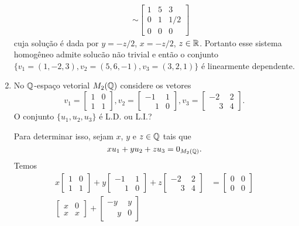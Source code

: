 \begin{exemplos}
\begin{enumerate}
\begin{align*}
\begin{array}{l}
				\end{array}\\&\sim
				\begin{bmatrix}
					1 & 5 & 3\\
					0 & 1 & 1/2\\
					0 & 0 & 0
				\end{bmatrix}
			\end{align*}
			cuja solução é dada por $y = -z/2$, $x =-z/2$, $z \in \mathbb{R}$. Portanto esse
			sistema homogêneo admite solucão não trivial e então o conjunto
			$\{v_1 = (1, -2, 3), v_2 = (5, 6, -1), v_3 = (3, 2, 1)\}$ é linearmente dependente.

		\item No $\mathbb{Q}$-espaço vetorial $M_2(\mathbb{Q})$ considere os vetores
			\[
				v_1 = \begin{bmatrix}1 & 0\\1 & 1\end{bmatrix},
				v_2 = \begin{bmatrix}-1 & 1\\\phantom{-} 1 & 0\end{bmatrix},
				v_3 = \begin{bmatrix}-2 & 2\\\phantom{-} 3 & 4\end{bmatrix}.
			\]
			O conjunto $\{u_1, u_2, u_3\}$ é L.D. ou L.I.?
			\begin{solucao}
				Para determinar isso, sejam $x$, $y$ e $z \in \mathbb{Q}$ tais que
				\[
					xu_1 + yu_2 + zu_3 = 0_{M_2(\mathbb{Q})}.
				\]
				Temos
				\begin{align*}
					x\begin{bmatrix}1 & 0\\1 & 1\end{bmatrix}
					+ y\begin{bmatrix}-1 & 1\\\phantom{-} 1 & 0\end{bmatrix}
					+ z\begin{bmatrix}-2 & 2\\\phantom{-} 3 & 4\end{bmatrix}
															 &= \begin{bmatrix}0 & 0\\0 & 0\end{bmatrix}
					\\\begin{bmatrix}x & 0\\x & x\end{bmatrix}
					+ \begin{bmatrix}-y & y\\\phantom{-} y & 0\end{bmatrix}

\end{align*}
\end{solucao}
\end{enumerate}
\end{exemplos}
